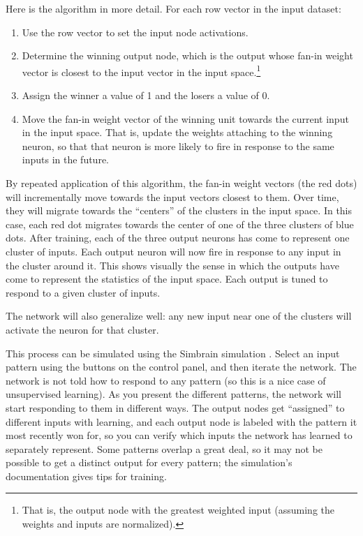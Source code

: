 Here is the algorithm in more detail. For each row vector in the input dataset:
\begin{enumerate}
\item Use the row vector to set the input node activations.
\item Determine the winning output node, which is the output whose fan-in weight vector is closest to the input vector in the input space.\footnote{That is, the output node with the greatest weighted input (assuming the weights and inputs are normalized).} 
\item Assign the winner a value of 1 and the losers a value of 0.
\item Move the fan-in weight vector of the winning unit towards the current input in the input space. That is, update the weights attaching to the winning neuron, so that that neuron is more likely to fire in response to the same inputs in the future.
\end{enumerate}
By repeated application of this algorithm, the fan-in weight vectors (the red dots) will incrementally move towards the input vectors closest to them. Over time, they will migrate towards the ``centers'' of the clusters in the  input space. In this case, each red dot migrates towards the center of one of the three clusters of blue dots. After training, each of the three output neurons has come to represent one cluster of inputs. Each output neuron will now fire in response to any input in the cluster around it. This shows visually the sense in which the outputs have come to represent the statistics of the input space. Each output is tuned to respond to a given cluster of inputs. 

The network will also generalize well: any new input near one of the clusters will activate the neuron for that cluster. 

This process can be simulated using the Simbrain simulation . Select an input pattern using the buttons on the control panel, and then iterate the network. The network is not told how to respond to any pattern (so this is a nice case of unsupervised learning). As you present the different patterns, the network will start responding to them in different ways. The output nodes get ``assigned'' to different inputs with learning, and each output node is labeled with the pattern it most recently won for, so you can verify which inputs the network has learned to separately represent. Some patterns overlap a great deal, so it may not be possible to get a distinct output for every pattern; the simulation's documentation gives tips for training.


